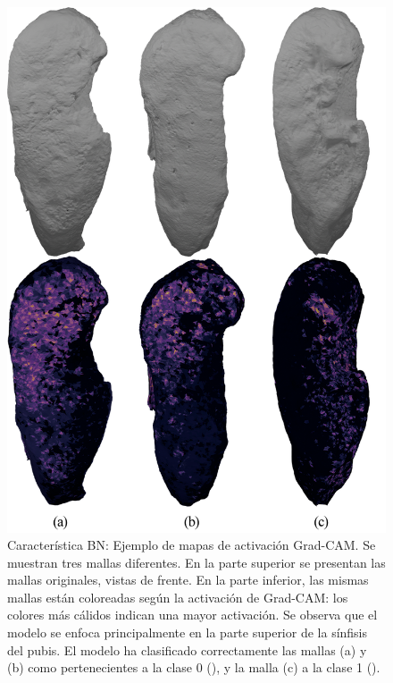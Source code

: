 \begin{figure}[p]
    \centering
    \includegraphics[width=\linewidth]{figures/5_experiments/grad-cam-BN-samples.png}
    \caption[Característica BN: Ejemplo de mapas de activación Grad-CAM]{Característica BN: Ejemplo de mapas de activación Grad-CAM. Se muestran tres mallas diferentes. En la parte superior se presentan las mallas originales, vistas de frente. En la parte inferior, las mismas mallas están coloreadas según la activación de Grad-CAM: los colores más cálidos indican una mayor activación. Se observa que el modelo se enfoca principalmente en la parte superior de la sínfisis del pubis. El modelo ha clasificado correctamente las mallas (a) y (b) como pertenecientes a la clase 0 (), y la malla (c) a la clase 1 ().}
    \label{fig5:grad_cam__BN_samples}
\end{figure}


